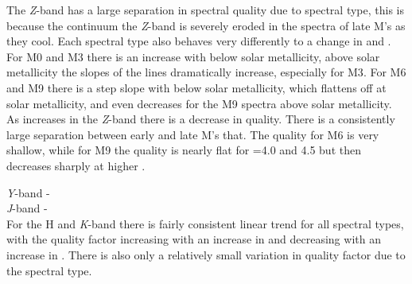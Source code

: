{The \emph{Z}-band has a large separation in spectral quality due to spectral type, this is because the continuum the \emph{Z}-band is severely eroded in the spectra of late M's as they cool.
Each spectral type also behaves very differently to a change in \feh{} and \Logg{}.
For {M0} and {M3} there is an increase with \feh{} below solar metallicity, above solar metallicity the slopes of the lines dramatically increase, especially for {M3}.
For {M6} and {M9} there is a step slope with \feh{} below solar metallicity, which flattens off at solar metallicity, and even decreases for the {M9} spectra above solar metallicity.
As \Logg{} increases in the \emph{Z}-band there is a decrease in quality.
There is a consistently large separation between early and late M's that.
The quality for {M6} is very shallow, while for {M9} the quality is nearly flat for \Logg{}=4.0 and 4.5 but then decreases sharply at higher \Logg{}.

\emph{Y}-band -\\

\emph{J}-band - \\

For the H and \emph{K}-band there is fairly consistent linear trend for all spectral types, with the quality factor increasing with an increase in \feh{} and decreasing with an increase in \Logg{}.
There is also only a relatively small variation in quality factor due to the spectral type.



}
